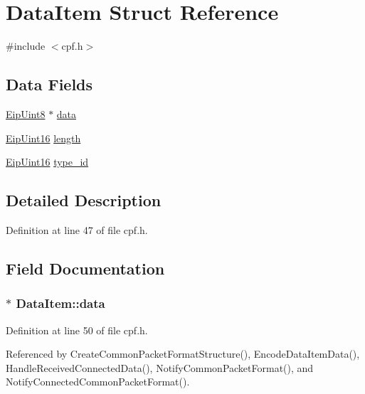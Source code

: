 \hypertarget{structDataItem}{\section{\-Data\-Item \-Struct \-Reference}
\label{de/d71/structDataItem}
}


{\ttfamily \#include $<$cpf.\-h$>$}

\subsection*{\-Data \-Fields}
\begin{DoxyCompactItemize}
\item 
\hyperlink{typedefs_8h_aa0c108ee762a27720919a4634643040e}{\-Eip\-Uint8} $\ast$ \hyperlink{structDataItem_a41b6c57403987dc9eb760942e3383f89}{data}
\item 
\hyperlink{typedefs_8h_ac1b4cfa25b4f5def62f23b455dd395d8}{\-Eip\-Uint16} \hyperlink{structDataItem_a70de504e7692ab2c73be4c96911c9b05}{length}
\item 
\hyperlink{typedefs_8h_ac1b4cfa25b4f5def62f23b455dd395d8}{\-Eip\-Uint16} \hyperlink{structDataItem_acf4b53bdfe8766830d313e9c7e1cf5dc}{type\-\_\-id}
\end{DoxyCompactItemize}


\subsection{\-Detailed \-Description}


\-Definition at line 47 of file cpf.\-h.



\subsection{\-Field \-Documentation}
\hypertarget{structDataItem_a41b6c57403987dc9eb760942e3383f89}{
\subsubsection[{data}]{$\ast$ {\bf \-Data\-Item\-::data}}}\label{de/d71/structDataItem_a41b6c57403987dc9eb760942e3383f89}


\-Definition at line 50 of file cpf.\-h.



\-Referenced by \-Create\-Common\-Packet\-Format\-Structure(), \-Encode\-Data\-Item\-Data(), \-Handle\-Received\-Connected\-Data(), \-Notify\-Common\-Packet\-Format(), and \-Notify\-Connected\-Common\-Packet\-Format().

